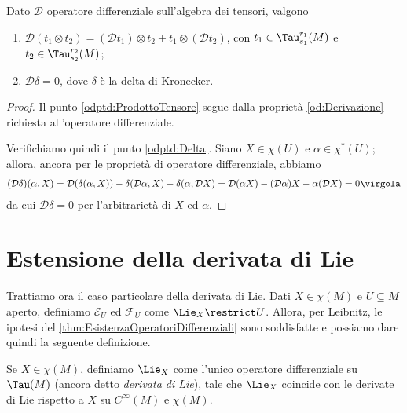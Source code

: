 \begin{corollary} \label{cor:OperatoreDifferenzialeProdottoTensoreEDelta}
	Dato $\mathcal D$ operatore differenziale sull'algebra dei tensori, valgono
	\begin{enumerate}
		\item $\mathcal D(t_1\otimes t_2) = (\mathcal D t_1) \otimes t_2 + t_1\otimes (\mathcal D t_2)$, con $t_1 \in \Tau^{r_1}_{s_1}(M)$ e $t_2 \in \Tau^{r_2}_{s_2}(M)$; \label{odptd:ProdottoTensore}
		\item $\mathcal D\delta = 0$, dove $\delta$ è la delta di Kronecker. \label{odptd:Delta}
	\end{enumerate}
\end{corollary}
\begin{proof}
	Il punto \ref{odptd:ProdottoTensore} segue dalla proprietà \ref{od:Derivazione} richiesta all'operatore differenziale. 
	
	Verifichiamo quindi il punto \ref{odptd:Delta}.	
	Siano $X\in\chi(U)$ e $\alpha\in\chi^*(U)$; allora, ancora per le proprietà di operatore differenziale, abbiamo
	\begin{align*}
	(\mathcal D\delta)(\alpha, X) = \mathcal D(\delta(\alpha,X)) - \delta(\mathcal D\alpha,X) - \delta(\alpha,\mathcal D X) = \mathcal D (\alpha X) - (\mathcal D\alpha)X - \alpha(\mathcal DX) = 0\virgola
	\end{align*}
	da cui $\mathcal D\delta = 0$ per l'arbitrarietà di $X$ ed $\alpha$.
\end{proof}

\section{Estensione della derivata di Lie}

Trattiamo ora il caso particolare della derivata di Lie.
Dati $X\in\chi(M)$ e $U\subseteq M$ aperto, definiamo $\mathcal E_U$ ed $\mathcal F_U$ come $\Lie_X\restrict U$.
Allora, per Leibnitz, le ipotesi del \cref{thm:EsistenzaOperatoriDifferenziali} sono soddisfatte e possiamo dare quindi la seguente definizione.

\begin{definition} 
	Se $X\in\chi(M)$, definiamo $\Lie_X$ come l'unico operatore differenziale su $\Tau(M)$ (ancora detto \emph{derivata di Lie}), tale che $\Lie_X$ coincide con le derivate di Lie rispetto a $X$ su $C^\infty(M)$ e $\chi(M)$.
\end{definition}


